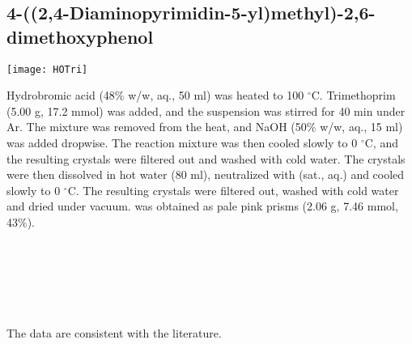 

\subsection{4-((2,4-Diaminopyrimidin-5-yl)methyl)-2,6-dimethoxyphenol }


\begin{scheme}[H]
	\begin{center}
		\texttt{[image: HOTri]}
	\end{center}
\end{scheme}

Hydrobromic acid (48\% w/w, aq., 50 ml) was heated to 100 $^{\circ}$C. Trimethoprim  (5.00 g, 17.2 mmol) was added, and the suspension was stirred for 40 min under Ar. The mixture was removed from the heat, and NaOH (50\% w/w, aq., 15 ml) was added dropwise. The reaction mixture was then cooled slowly to 0 $^{\circ}$C, and the resulting crystals were filtered out and washed with cold water. The crystals were then dissolved in hot water (80 ml), neutralized with  (sat., aq.) and cooled slowly to 0 $^{\circ}$C. The resulting crystals were filtered out, washed with cold water and dried under vacuum.  was obtained as pale pink prisms (2.06 g, 7.46 mmol, 43\%).
\\[1\baselineskip]
\\[1\baselineskip]
\\[1\baselineskip]
\\[1\baselineskip]
\\[1\baselineskip]
\\[1\baselineskip]
\\[1\baselineskip]
The data are consistent with the literature\cite{Jing2013}.

